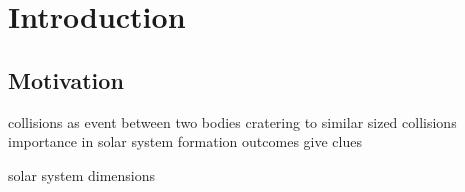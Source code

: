 \chapter{Introduction}

\section{Motivation}
collisions as event between two bodies
cratering to similar sized collisions
importance in solar system formation
outcomes give clues 

solar system dimensions



\citep{Asphaug:2010p3539}
\citep{Melosh:1989p996}





